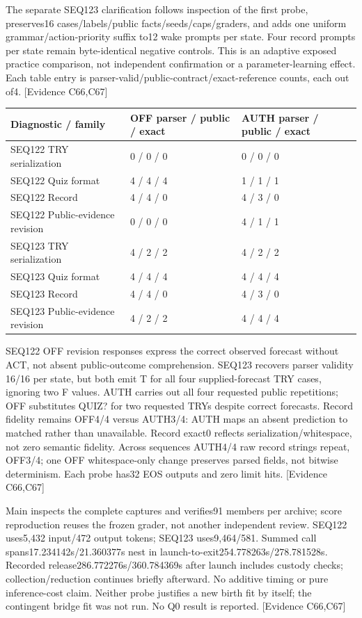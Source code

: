\documentclass[11pt]{article}
\newcommand{\ev}[1]{\textsf{[Evidence #1]}}
\begin{document}
The separate SEQ123 clarification follows inspection of the first probe,
preserves16 cases/labels/public facts/seeds/caps/graders, and adds one uniform
grammar/action-priority suffix to12 wake prompts per state. Four record prompts
per state remain byte-identical negative controls. This is an adaptive exposed
practice comparison, not independent confirmation or a parameter-learning
effect. Each table entry is parser-valid/public-contract/exact-reference counts,
each out of4. \ev{C66,C67}

\begin{center}\small
\begin{tabular}{lll}
\toprule
Diagnostic / family & OFF parser / public / exact & AUTH parser / public / exact \\
\midrule
SEQ122 TRY serialization & 0 / 0 / 0 & 0 / 0 / 0 \\
SEQ122 Quiz format & 4 / 4 / 4 & 1 / 1 / 1 \\
SEQ122 Record & 4 / 4 / 0 & 4 / 3 / 0 \\
SEQ122 Public-evidence revision & 0 / 0 / 0 & 4 / 1 / 1 \\
SEQ123 TRY serialization & 4 / 2 / 2 & 4 / 2 / 2 \\
SEQ123 Quiz format & 4 / 4 / 4 & 4 / 4 / 4 \\
SEQ123 Record & 4 / 4 / 0 & 4 / 3 / 0 \\
SEQ123 Public-evidence revision & 4 / 2 / 2 & 4 / 4 / 4 \\
\bottomrule
\end{tabular}
\end{center}

SEQ122 OFF revision responses express the correct observed forecast without
ACT, not absent public-outcome comprehension. SEQ123 recovers parser validity
16/16 per state, but both emit T for all four supplied-forecast TRY cases,
ignoring two F values. AUTH carries out all four requested public repetitions;
OFF substitutes QUIZ? for two requested TRYs despite correct forecasts. Record
fidelity remains OFF4/4 versus AUTH3/4: AUTH maps an absent prediction to matched
rather than unavailable. Record exact0 reflects serialization/whitespace, not
zero semantic fidelity. Across sequences AUTH4/4 raw record strings repeat,
OFF3/4; one OFF whitespace-only change preserves parsed fields, not bitwise
determinism. Each probe has32 EOS outputs and zero limit hits. \ev{C66,C67}

Main inspects the complete captures and verifies91 members per archive;
score reproduction reuses the frozen grader, not another independent review.
SEQ122 uses5{,}432 input/472 output tokens; SEQ123 uses9{,}464/581. Summed call
spans17.234142s/21.360377s nest in launch-to-exit254.778263s/278.781528s.
Recorded release286.772276s/360.784369s after launch includes custody checks;
collection/reduction continues briefly afterward. No additive timing or pure
inference-cost claim. Neither probe justifies a new birth fit by itself; the
contingent bridge fit was not run. No Q0 result is reported. \ev{C66,C67}
\end{document}
